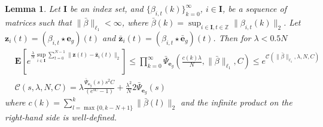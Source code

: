 \documentclass{article}
\def\rve{{\mathbf{e}}}
\def\rvz{{\mathbf{z}}}
\newtheorem{lemma}[theorem]{Lemma}
\newcommand{\e}{\mathbf{e}}
\newcommand{\bE}{\mathbf{E}}
\begin{document}
\begin{lemma}
\label{basic_lemma:lipschitz}
Let $\mathbf{I}$ be an index set, and $\{\beta_{i,t}(k)\}_{k=0}^{\infty}$, $i \in \mathbf{I}$, be a sequence of matrices such that $\|\bar{\beta}\|_{\ell_1}< \infty$, where $\bar{\beta}(k)=\sup_{i \in \mathbf{I},t \in \mathbb{Z}} \|\beta_{i,t}(k)\|_2$. Let $\rvz_{i}(t)=(\beta_{i,t} \star \e_g)(t)$ and
$\bar{\rvz}_i(t)=(\beta_{i,t} \star \bar{\e}_g)(t)$.
Then for $\lambda < 0.5N$
 \begin{align*}
 & \bE[e^{\frac{\lambda}{N} \sup_{i \in \mathbf{I}}\sum_{t=0}^{N-1} \|\rvz(t)-\bar{\rvz}_i(t)\|_2}]
  \le \prod_{k=0}^{\infty} 
  \bar{\Psi}_{\rve_g}\left(\frac{c(k) \lambda}{N},\|\bar{\beta}\|_{\ell_1},C\right) \le 
   e^{\mathcal{C}(\|\bar{\beta}\|_{\ell_1},\lambda,N,C)}  \\
   & \mathcal{C}(s,\lambda,N,C)=\lambda \frac{\bar{\Psi}_{\rve_g}(s)s^2C}{(e^{sC}-1)}+
     \frac{\lambda^2}{N} 2\bar{\Psi}_{\rve_g}( s)
 \end{align*} 
 where 
 $c(k)=\sum_{l=\max\{0,k-N+1\}}^{k} \|\bar{\beta}(l)\|_2$
 and the infinite product on the right-hand side is well-defined. 
\end{lemma}
\end{document}
